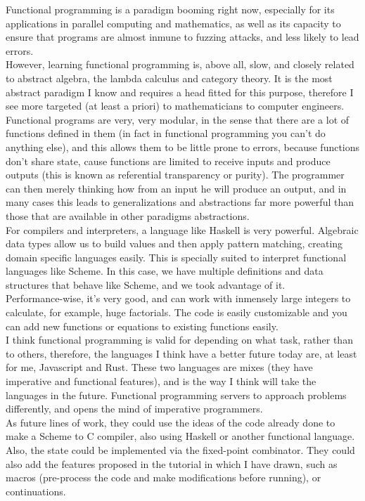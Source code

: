 
Functional programming is a paradigm booming right now, especially for its applications in parallel computing and mathematics, as well as its capacity to ensure that programs are almost inmune to fuzzing attacks, and less likely to lead errors.\\

However, learning functional programming is, above all, slow, and closely related to abstract algebra, the lambda calculus and category theory. It is the most abstract paradigm I know and requires a head fitted for this purpose, therefore I see more targeted (at least a priori) to mathematicians to computer engineers.\\

Functional programs are very, very modular, in the sense that there are a lot of functions defined in them (in fact in functional programming you can't do anything else), and this allows them to be little prone to errors, because functions don't share state, cause functions are limited to receive inputs and produce outputs (this is known as referential transparency or purity). The programmer can then merely thinking how from an input he will produce an output, and in many cases this leads to generalizations and abstractions far more powerful than those that are available in other paradigms abstractions.\\

For compilers and interpreters, a language like Haskell is very powerful. Algebraic data types allow us to build values and then apply pattern matching, creating domain specific languages easily. This is specially suited to interpret functional languages like Scheme. In this case, we have multiple definitions and data structures that behave like Scheme, and we took advantage of it.\\

Performance-wise, it's very good, and can work with inmensely large integers to calculate, for example, huge factorials. The code is easily customizable and you can add new functions or equations to existing functions easily.\\

I think functional programming is valid for depending on what task, rather than to others, therefore, the languages I think have a better future today are, at least for me, Javascript and Rust. These two languages are mixes (they have imperative and functional features), and is the way I think will take the languages in the future. Functional programming servers to approach problems differently, and opens the mind of imperative programmers.\\

As future lines of work, they could use the ideas of the code already done to make a Scheme to C compiler, also using Haskell or another functional language. Also, the state could be implemented via the fixed-point combinator. They could also add the features proposed in the tutorial in which I have drawn, such as macros (pre-process the code and make modifications before running), or continuations.
